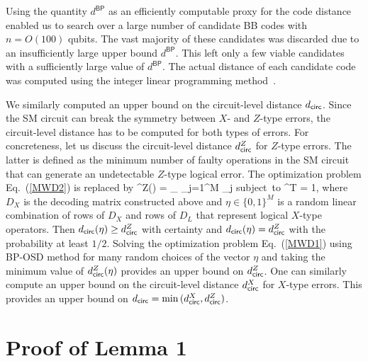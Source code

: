 \documentclass{article}
\begin{document}
Using the quantity $d^{\mathsf{BP}}$ as an efficiently computable proxy for the code distance
enabled us to search over a large number of candidate BB codes
with $n=O(100)$ qubits. The vast majority of these candidates was discarded due to an
insufficiently large upper bound $d^{\mathsf{BP}}$. 
This left only a few  viable candidates with a sufficiently large value of $d^{\mathsf{BP}}$.
The actual distance of each  candidate code was computed 
using the  integer linear programming method~\cite{landahl2011fault}.

We similarly 
computed an upper bound on the circuit-level distance $d_{\mathsf{circ}}$. 
Since the SM circuit can break the symmetry between $X$- and $Z$-type errors, the circuit-level distance has to be computed for both types of errors. 
For concreteness, let us discuss
the circuit-level distance 
$d_{\mathsf{circ}}^Z$ for $Z$-type errors.
The latter is defined as the minimum number of faulty operations in the SM circuit that can generate an undetectable $Z$-type logical error. 
The optimization problem 
Eq.~(\ref{MWD2}) is replaced by
\be
\label{MWD1}
\dcirc^Z(\eta) =  \min_{\xi \in
{}}
\; \sum_{j=1}^M \xi_j \quad
\mbox{subject to} \quad
\eta^T \xi = 1,
\ee
where $D_X$ is the decoding matrix constructed above
and $\eta\in \{0,1\}^M$
is a random linear combination of rows of $D_X$ and rows of $D_L$ that represent logical $X$-type operators. 
Then $d_{\mathsf{circ}}(\eta)\ge d_{\mathsf{circ}}^Z$
with certainty and $d_{\mathsf{circ}}(\eta)=d_{\mathsf{circ}}^Z$
with the probability at least $1/2$.
Solving the optimization problem
Eq.~(\ref{MWD1}) using BP-OSD method for many  random choices of the vector $\eta$ and taking the minimum value of $d_{\mathsf{circ}}^Z(\eta)$
provides an upper bound
on $d_{\mathsf{circ}}^Z$.
One can similarly compute an upper
bound on the circuit-level distance $d_{\mathsf{circ}}^X$ for $X$-type errors. This provides an upper bound on $d_{\mathsf{circ}}=\min{(d_{\mathsf{circ}}^X,d_{\mathsf{circ}}^Z)}$.



\section{Proof of Lemma 1}
\end{document}

